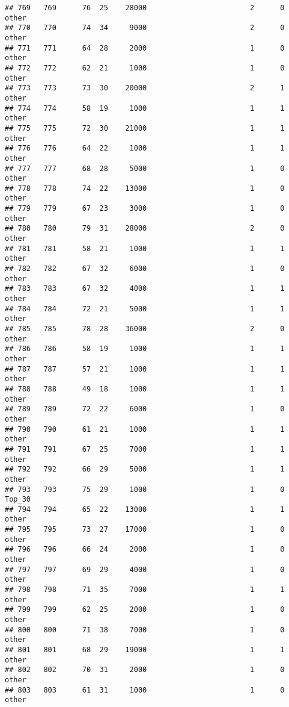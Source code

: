 \documentclass[
]{article}
\begin{document}
\begin{verbatim}
## 769   769      76  25    28000                        2      0    other
## 770   770      74  34     9000                        2      0    other
## 771   771      64  28     2000                        1      0    other
## 772   772      62  21     1000                        1      0    other
## 773   773      73  30    20000                        2      1    other
## 774   774      58  19     1000                        1      1    other
## 775   775      72  30    21000                        1      1    other
## 776   776      64  22     1000                        1      1    other
## 777   777      68  28     5000                        1      0    other
## 778   778      74  22    13000                        1      0    other
## 779   779      67  23     3000                        1      0    other
## 780   780      79  31    28000                        2      0    other
## 781   781      58  21     1000                        1      1    other
## 782   782      67  32     6000                        1      0    other
## 783   783      67  32     4000                        1      1    other
## 784   784      72  21     5000                        1      1    other
## 785   785      78  28    36000                        2      0    other
## 786   786      58  19     1000                        1      1    other
## 787   787      57  21     1000                        1      1    other
## 788   788      49  18     1000                        1      1    other
## 789   789      72  22     6000                        1      0    other
## 790   790      61  21     1000                        1      1    other
## 791   791      67  25     7000                        1      1    other
## 792   792      66  29     5000                        1      1    other
## 793   793      75  29     1000                        1      0   Top_30
## 794   794      65  22    13000                        1      1    other
## 795   795      73  27    17000                        1      0    other
## 796   796      66  24     2000                        1      0    other
## 797   797      69  29     4000                        1      0    other
## 798   798      71  35     7000                        1      1    other
## 799   799      62  25     2000                        1      0    other
## 800   800      71  38     7000                        1      0    other
## 801   801      68  29    19000                        1      1    other
## 802   802      70  31     2000                        1      0    other
## 803   803      61  31     1000                        1      0    other

\end{verbatim}
\end{document}
